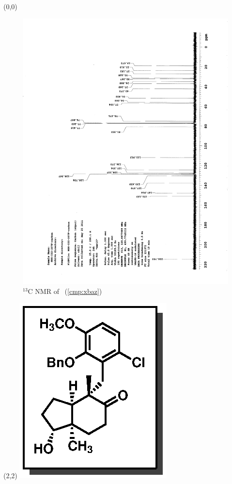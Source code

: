 \clearpage
\begin{textblock}{20}(0,0)
\begin{figure}[htb]
\caption{$^{13}$C NMR of  \CMPxbaz\ (\ref{cmp:xbaz})}
\includegraphics[scale=0.75, trim = 0mm 0mm 0mm 5mm,
clip]{chp_singlecarbon/images/nmr/xbazC}
\vspace{-100pt}
\end{figure}
\end{textblock}
\begin{textblock}{1}(2,2)
\includegraphics[scale=0.8, angle=90]{chp_singlecarbon/images/xbaz}
\end{textblock}
\clearpage

